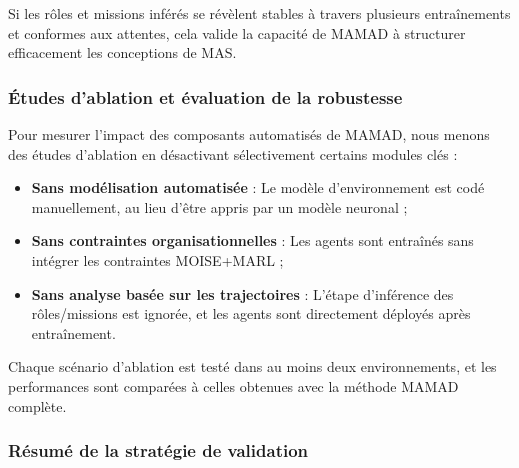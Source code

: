 \documentclass[pdflatex,sn-mathphys-num]{sn-jnl}%
\theoremstyle{thmstyleone}%
\theoremstyle{thmstyletwo}%
\theoremstyle{thmstylethree}%
\begin{document}
Si les rôles et missions inférés se révèlent stables à travers plusieurs entraînements et conformes aux attentes, cela valide la capacité de MAMAD à structurer efficacement les conceptions de MAS.

\subsubsection{Études d'ablation et évaluation de la robustesse}

Pour mesurer l'impact des composants automatisés de MAMAD, nous menons des études d'ablation en désactivant sélectivement certains modules clés :

\begin{itemize}
    \item \textbf{Sans modélisation automatisée} : Le modèle d'environnement est codé manuellement, au lieu d'être appris par un modèle neuronal ;
    \item \textbf{Sans contraintes organisationnelles} : Les agents sont entraînés sans intégrer les contraintes MOISE+MARL ;
    \item \textbf{Sans analyse basée sur les trajectoires} : L'étape d'inférence des rôles/missions est ignorée, et les agents sont directement déployés après entraînement.
\end{itemize}

Chaque scénario d'ablation est testé dans au moins deux environnements, et les performances sont comparées à celles obtenues avec la méthode MAMAD complète.

\subsubsection{Résumé de la stratégie de validation}
\end{document}
